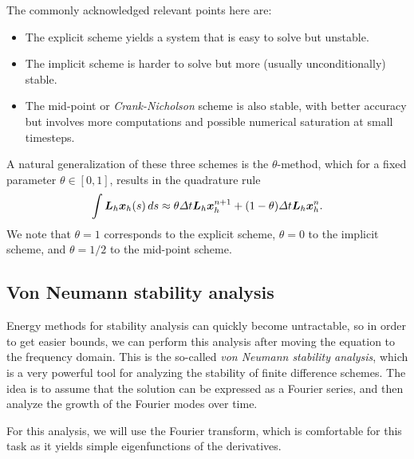     The commonly acknowledged relevant points here are: 
    \begin{itemize}
        \item The explicit scheme yields a system that is easy to solve but unstable.
        \item The implicit scheme is harder to solve but more (usually unconditionally) stable.
        \item The mid-point or \emph{Crank-Nicholson} scheme is also stable, with better accuracy but involves more computations and possible numerical saturation at small timesteps.
    \end{itemize}
A natural generalization of these three schemes is the $\theta$-method, which for a fixed parameter $\theta\in[0,1]$, results in the quadrature rule
\begin{equation}
    \int \mat L_h \vec x_h(s)\,ds \approx \theta\Delta t \mat L_h\vec x_h^{n+1} + (1-\theta)\Delta t \mat L_h \vec x_h^n.
\end{equation}
We note that $\theta=1$ corresponds to the explicit scheme, $\theta=0$ to the implicit scheme, and $\theta=1/2$ to the mid-point scheme. 
    
\subsection{Von Neumann stability analysis}
Energy methods for stability analysis can quickly become untractable, so in order to get easier bounds, we can perform this analysis after moving the equation to the frequency domain. This is the so-called \emph{von Neumann stability analysis}, which is a very powerful tool for analyzing the stability of finite difference schemes. The idea is to assume that the solution can be expressed as a Fourier series, and then analyze the growth of the Fourier modes over time.

For this analysis, we will use the Fourier transform, which is comfortable for this task as it yields simple eigenfunctions of the derivatives. 

